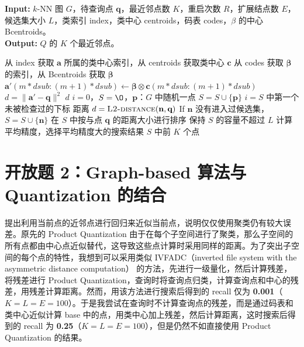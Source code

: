 \documentclass{article}
\newcommand{\tb}[1]{\textbf{#1}}
\begin{document}
\begin{algorithm}[ht]
\setlength{\abovecaptionskip}{0.cm}
\small
\caption{Search} %
\hspace*{0.02in} {\bf Input:} %
	$k$-NN 图 $G$，待查询点 $\tb q$，最近邻点数 $K$，重启次数 $R$，扩展结点数 $E$，候选集大小 $L$，类索引 index，类中心 centroids，码表 codes，$\beta$ 的中心 Bcentroids。 \\
\hspace*{0.02in} {\bf Output:} %
	$Q$ 的 $K$ 个最近邻点。
\begin{algorithmic}[1]
\Procedure{L2-distance}{$\tb a, \tb q$}
		\State 从 index 获取 $\tb a$ 所属的类中心索引，从 centroids 获取类中心 $\tb c$
				\State 从 codes 获取 $\boldsymbol \beta$ 的索引，从 Bcentroids 获取 $\boldsymbol \beta$
				\State $\tb a'(m * dsub : (m + 1) * dsub) \leftarrow \boldsymbol \beta \otimes \tb c(m * dsub : (m + 1) * dsub)$
		\EndFor
		\State $d = \lVert \tb a' - \tb q \rVert ^2$
		\State \Return $d$
\EndProcedure
{}
		\State $i = 0$，$S = \O$，$\tb p$：$G$ 中随机一点
		\State $S = S \cup \{ \tb p\}$
				\State $i = S$ 中第一个未被检查过的下标
				\For{$ \tb n$ in $N(\tb p_i, E, G)$}
						\State 距离 $d = \Call{L2-distance}{\tb n, \tb q}$
						\State If $ \tb n$ 没有进入过候选集，$S = S \cup \{ \tb n\}$
				\EndFor
				\State 在 $S$ 中按与点 $\tb q$ 的距离大小进行排序
				\State 保持 $S$ 的容量不超过 $L$
		\EndWhile
		\State 计算平均精度，选择平均精度大的搜索结果
\EndFor
\State \Return $S$ 中前 $K$ 个点
\end{algorithmic}
\end{algorithm}


\section{开放题 2：Graph-based 算法与 Quantization 的结合}

\cite{ref8} 提出利用当前点的近邻点进行回归来近似当前点，说明仅仅使用聚类仍有较大误差。原先的 Product Quantization 由于在每个子空间进行了聚类，那么子空间的所有点都由中心点近似替代，这导致这些点计算时采用同样的距离。为了突出子空间的每个点的特性，我想到可以采用类似 IVFADC（inverted file system with the asymmetric distance computation）\cite{ref9} 的方法，先进行一级量化，然后计算残差，将残差进行 Product Quantization，查询时将查询点归类，计算查询点和中心的残差，用残差计算距离。然而，用该方法进行搜索后得到的 recall 仅为 \tb{0.001}（$K = L = E = 100$）。于是我尝试在查询时不计算查询点的残差，而是通过码表和类中心近似计算 base 中的点，用类中心加上残差，然后计算距离，这时搜索后得到的 recall 为 \tb{0.25}（$K = L = E = 100$），但是仍然不如直接使用 Product Quantization 的结果。
\end{document}
